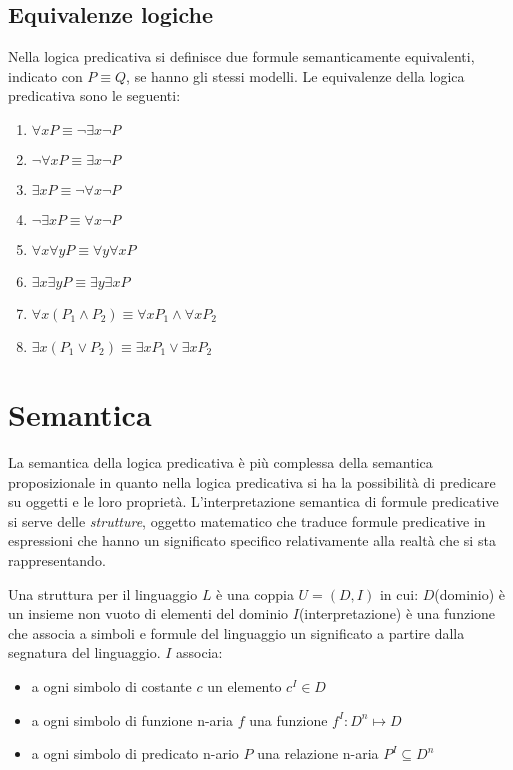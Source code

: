
\subsection{Equivalenze logiche}
Nella logica predicativa si definisce due formule semanticamente equivalenti,
indicato con $P \equiv Q$, se hanno gli stessi modelli.
Le equivalenze della logica predicativa sono le seguenti:
\begin{enumerate}
    \item $\forall x P \equiv \neg \exists x \neg P$
    \item $\neg \forall x P \equiv \exists x \neg P$
    \item $\exists x P \equiv \neg \forall x \neg P$
    \item $\neg \exists x P \equiv \forall x \neg P$
    \item $\forall x \forall y P \equiv \forall y \forall x P$
    \item $\exists x \exists y P \equiv \exists y \exists x P$
    \item $\forall x(P_1 \land P_2) \equiv \forall x P_1 \land \forall x P_2$
    \item $\exists x(P_1 \lor P_2) \equiv \exists x P_1 \lor \exists x P_2$
\end{enumerate}

\section{Semantica}
La semantica della logica predicativa è più complessa della semantica proposizionale
in quanto nella logica predicativa si ha la possibilità di predicare su oggetti e le loro proprietà.
L'interpretazione semantica di formule predicative si serve delle \emph{strutture},
oggetto matematico che traduce formule predicative in espressioni che hanno un significato
specifico relativamente alla realtà che si sta rappresentando.

\begin{defi}
    Una struttura per il linguaggio $L$ è una coppia $U = (D,I)$ in cui:
    $D$(dominio) è un insieme non vuoto di elementi del dominio
    $I$(interpretazione) è una funzione che associa a simboli e formule del linguaggio
    un significato  a partire dalla segnatura del linguaggio.
    $I$ associa:
    \begin{itemize}
        \item a ogni simbolo di costante $c$ un elemento $c^I \in D$
        \item a ogni simbolo di funzione n-aria $f$ una funzione $f^I:D^n \mapsto D$
        \item a ogni simbolo di predicato n-ario $P$ una relazione n-aria $P^I \subseteq D^n$
    \end{itemize}
\end{defi}

